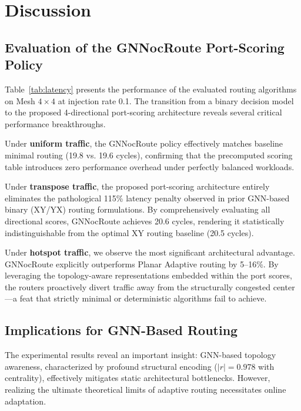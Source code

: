 \section{Discussion}
\label{sec:discussion}

\subsection{Evaluation of the GNNocRoute Port-Scoring Policy}

Table~\ref{tab:latency} presents the performance of the evaluated routing algorithms on Mesh $4\times4$ at injection rate 0.1. The transition from a binary decision model to the proposed 4-directional port-scoring architecture reveals several critical performance breakthroughs.

Under \textbf{uniform traffic}, the GNNocRoute policy effectively matches baseline minimal routing (19.8 vs. 19.6 cycles), confirming that the precomputed scoring table introduces zero performance overhead under perfectly balanced workloads.

Under \textbf{transpose traffic}, the proposed port-scoring architecture entirely eliminates the pathological 115\% latency penalty observed in prior GNN-based binary (XY/YX) routing formulations. By comprehensively evaluating all directional scores, GNNocRoute achieves 20.6 cycles, rendering it statistically indistinguishable from the optimal XY routing baseline (20.5 cycles).

Under \textbf{hotspot traffic}, we observe the most significant architectural advantage. GNNocRoute explicitly outperforms Planar Adaptive routing by 5--16\%. By leveraging the topology-aware representations embedded within the port scores, the routers proactively divert traffic away from the structurally congested center---a feat that strictly minimal or deterministic algorithms fail to achieve.

\subsection{Implications for GNN-Based Routing}

The experimental results reveal an important insight: GNN-based topology awareness, characterized by profound structural encoding ($|r| = 0.978$ with centrality), effectively mitigates static architectural bottlenecks. However, realizing the ultimate theoretical limits of adaptive routing necessitates online adaptation.

